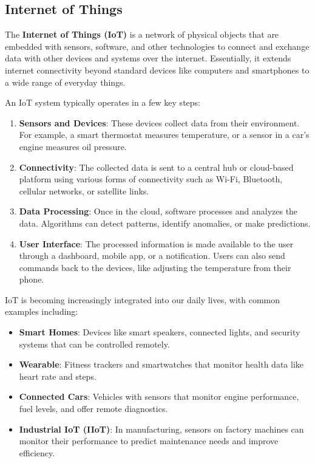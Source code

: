 \documentclass{article}
\begin{document}
\subsection*{Internet of Things}
The \textbf{Internet of Things (IoT)} is a network of physical objects that are embedded with sensors, software, and other technologies to connect and exchange data with other devices and systems over the internet. Essentially, it extends internet connectivity beyond standard devices like computers and smartphones to a wide range of everyday things.

An IoT system typically operates in a few key steps:

\begin{enumerate}
    \item \textbf{Sensors and Devices}: These devices collect data from their environment. For example, a smart thermostat measures temperature, or a sensor in a car's engine measures oil pressure.
    \item \textbf{Connectivity}: The collected data is sent to a central hub or cloud-based platform using various forms of connectivity such as Wi-Fi, Bluetooth, cellular networks, or satellite links.
    \item \textbf{Data Processing}: Once in the cloud, software processes and analyzes the data. Algorithms can detect patterns, identify anomalies, or make predictions.
    \item \textbf{User Interface}: The processed information is made available to the user through a dashboard, mobile app, or a notification. Users can also send commands back to the devices, like adjusting the temperature from their phone.
\end{enumerate}

IoT is becoming increasingly integrated into our daily lives, with common examples including:

\begin{itemize}
    \item \textbf{Smart Homes}: Devices like smart speakers, connected lights, and security systems that can be controlled remotely.
    \item \textbf{Wearable}: Fitness trackers and smartwatches that monitor health data like heart rate and steps.
    \item \textbf{Connected Cars}: Vehicles with sensors that monitor engine performance, fuel levels, and offer remote diagnostics.
    \item \textbf{Industrial IoT (IIoT)}: In manufacturing, sensors on factory machines can monitor their performance to predict maintenance needs and improve efficiency.
\end{itemize}
\end{document}
